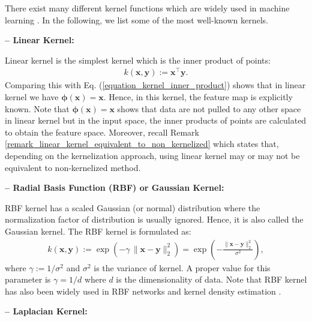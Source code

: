 \documentclass[lang=cn,10pt]{gorgeousnbook}
\numberwithin{equation}{section}%
\numberwithin{figure}{section}%
\begin{document}

There exist many different kernel functions which are widely used in machine learning \cite{rojo2018digital}. In the following, we list some of the most well-known kernels. 

\textbf{-- Linear Kernel:}

Linear kernel is the simplest kernel which is the inner product of points:
\begin{align}\label{equation_linear_kernel}
k(\boldsymbol{x}, \boldsymbol{y}) := \boldsymbol{x}^\top \boldsymbol{y}.
\end{align}
Comparing this with Eq. (\ref{equation_kernel_inner_product}) shows that in linear kernel we have $\boldsymbol{\phi}(\boldsymbol{x}) = \boldsymbol{x}$. Hence, in this kernel, the feature map is explicitly known. Note that $\boldsymbol{\phi}(\boldsymbol{x}) = \boldsymbol{x}$ shows that data are not pulled to any other space in linear kernel but in the input space, the inner products of points are calculated to obtain the feature space. 
Moreover, recall Remark \ref{remark_linear_kernel_equivalent_to_non_kernelized} which states that, depending on the kernelization approach, using linear kernel may or may not be equivalent to non-kernelized method. 

\textbf{-- Radial Basis Function (RBF) or Gaussian Kernel:}

RBF kernel has a scaled Gaussian (or normal) distribution where the normalization factor of distribution is usually ignored. Hence, it is also called the Gaussian kernel. The RBF kernel is formulated as:
\begin{align}\label{equation_RBF_kernel}
k(\boldsymbol{x}, \boldsymbol{y}) := \exp(-\gamma\, \|\boldsymbol{x} - \boldsymbol{y}\|_2^2) = \exp(-\frac{\|\boldsymbol{x} - \boldsymbol{y}\|_2^2}{\sigma^2}),
\end{align}
where $\gamma := 1/\sigma^2$ and $\sigma^2$ is the variance of kernel. 
A proper value for this parameter is $\gamma=1/d$ where $d$ is the dimensionality of data.
Note that RBF kernel has also been widely used in RBF networks \cite{orr1996introduction} and kernel density estimation \cite{scott1992multivariate}.

\textbf{-- Laplacian Kernel:}
\end{document}
